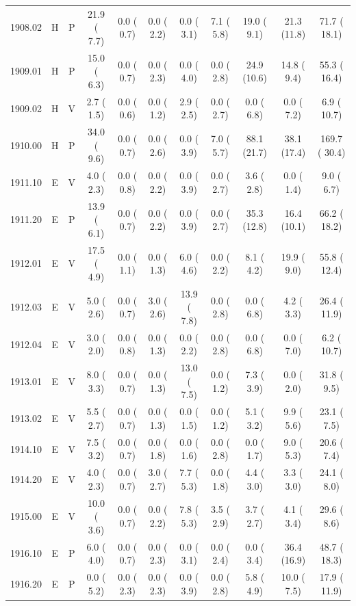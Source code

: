 \documentclass[11pt,twocolumn]{article}
\begin{document}
\begin{table}[]
{\begin{tabular}{ccccccccccc}
1908.02 & H & P & 21.9 ( 7.7) &  0.0 ( 0.7) &  0.0 ( 2.2) &  0.0 ( 3.1) &  7.1 ( 5.8) & 19.0 ( 9.1) & 21.3 (11.8) &  71.7 ( 18.1) \\
1909.01 & H & P & 15.0 ( 6.3) &  0.0 ( 0.7) &  0.0 ( 2.3) &  0.0 ( 4.0) &  0.0 ( 2.8) & 24.9 (10.6) & 14.8 ( 9.4) &  55.3 ( 16.4) \\
1909.02 & H & V &  2.7 ( 1.5) &  0.0 ( 0.6) &  0.0 ( 1.2) &  2.9 ( 2.5) &  0.0 ( 2.7) &  0.0 ( 6.8) &  0.0 ( 7.2) &   6.9 ( 10.7) \\
1910.00 & H & P & 34.0 ( 9.6) &  0.0 ( 0.7) &  0.0 ( 2.6) &  0.0 ( 3.9) &  7.0 ( 5.7) & 88.1 (21.7) & 38.1 (17.4) & 169.7 ( 30.4) \\
1911.10 & E & V &  4.0 ( 2.3) &  0.0 ( 0.8) &  0.0 ( 2.2) &  0.0 ( 3.9) &  0.0 ( 2.7) &  3.6 ( 2.8) &  0.0 ( 1.4) &   9.0 (  6.7) \\
1911.20 & E & P & 13.9 ( 6.1) &  0.0 ( 0.7) &  0.0 ( 2.2) &  0.0 ( 3.9) &  0.0 ( 2.7) & 35.3 (12.8) & 16.4 (10.1) &  66.2 ( 18.2) \\
1912.01 & E & V & 17.5 ( 4.9) &  0.0 ( 1.1) &  0.0 ( 1.3) &  6.0 ( 4.6) &  0.0 ( 2.2) &  8.1 ( 4.2) & 19.9 ( 9.0) &  55.8 ( 12.4) \\
1912.03 & E & V &  5.0 ( 2.6) &  0.0 ( 0.7) &  3.0 ( 2.6) & 13.9 ( 7.8) &  0.0 ( 2.8) &  0.0 ( 6.8) &  4.2 ( 3.3) &  26.4 ( 11.9) \\
1912.04 & E & V &  3.0 ( 2.0) &  0.0 ( 0.8) &  0.0 ( 1.3) &  0.0 ( 2.2) &  0.0 ( 2.8) &  0.0 ( 6.8) &  0.0 ( 7.0) &   6.2 ( 10.7) \\
1913.01 & E & V &  8.0 ( 3.3) &  0.0 ( 0.7) &  0.0 ( 1.3) & 13.0 ( 7.5) &  0.0 ( 1.2) &  7.3 ( 3.9) &  0.0 ( 2.0) &  31.8 (  9.5) \\
1913.02 & E & V &  5.5 ( 2.7) &  0.0 ( 0.7) &  0.0 ( 1.3) &  0.0 ( 1.5) &  0.0 ( 1.2) &  5.1 ( 3.2) &  9.9 ( 5.6) &  23.1 (  7.5) \\
1914.10 & E & V &  7.5 ( 3.2) &  0.0 ( 0.7) &  0.0 ( 1.8) &  0.0 ( 1.6) &  0.0 ( 2.8) &  0.0 ( 1.7) &  9.0 ( 5.3) &  20.6 (  7.4) \\
1914.20 & E & V &  4.0 ( 2.3) &  0.0 ( 0.7) &  3.0 ( 2.7) &  7.7 ( 5.3) &  0.0 ( 1.8) &  4.4 ( 3.0) &  3.3 ( 3.0) &  24.1 (  8.0) \\
1915.00 & E & V & 10.0 ( 3.6) &  0.0 ( 0.7) &  0.0 ( 2.2) &  7.8 ( 5.3) &  3.5 ( 2.9) &  3.7 ( 2.7) &  4.1 ( 3.4) &  29.6 (  8.6) \\
1916.10 & E & P &  6.0 ( 4.0) &  0.0 ( 0.7) &  0.0 ( 2.3) &  0.0 ( 3.1) &  0.0 ( 2.4) &  0.0 ( 3.4) & 36.4 (16.9) &  48.7 ( 18.3) \\
1916.20 & E & P &  0.0 ( 5.2) &  0.0 ( 2.3) &  0.0 ( 2.3) &  0.0 ( 3.9) &  0.0 ( 2.8) &  5.8 ( 4.9) & 10.0 ( 7.5) &  17.9 ( 11.9) \\

\end{tabular}}
\end{table}
\end{document}

